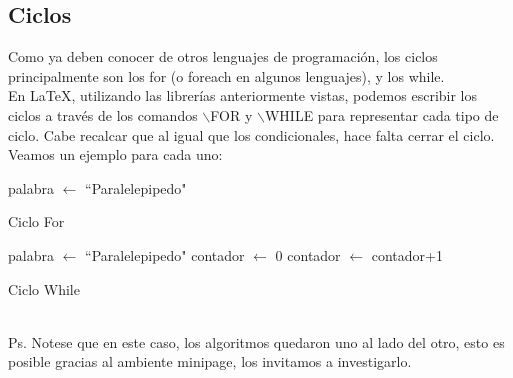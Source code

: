 \documentclass[letterpaper,12pt]{article}
\begin{document}
\subsection{Ciclos}
Como ya deben conocer de otros lenguajes de programación, los ciclos principalmente son los for (o foreach en algunos lenguajes), y los while.\\
En {\LaTeX}, utilizando las librerías anteriormente vistas, podemos escribir los ciclos a través de los comandos $\backslash$FOR y $\backslash$WHILE para representar cada tipo de ciclo. Cabe recalcar que al igual que los condicionales, hace falta cerrar el ciclo.\\[0.1cm]
Veamos un ejemplo para cada uno:\\
\begin{minipage}[t]{0.42\textwidth}
\begin{algorithm}[H]
\begin{algorithmic}[1]
        \STATE palabra $\leftarrow$ ``Paralelepipedo"
        \ENDFOR
  \end{algorithmic}
  \caption{Ciclo For}
  \label{alg:testing4}
\end{algorithm}
\end{minipage}
\hspace{0.5cm}
\begin{minipage}[t]{0.42\textwidth}
\begin{algorithm}[H]
\begin{algorithmic}[1]
        \STATE palabra $\leftarrow$ ``Paralelepipedo"
        \STATE contador $\leftarrow$ 0
        \STATE contador $\leftarrow$ contador+1
        \ENDWHILE
  \end{algorithmic}
  \caption{Ciclo While}
  \label{alg:testing5}
\end{algorithm}
\end{minipage}\\[0.2cm]
Ps. Notese que en este caso, los algoritmos quedaron uno al lado del otro, esto es posible gracias al ambiente minipage, los invitamos a investigarlo.
\end{document}
